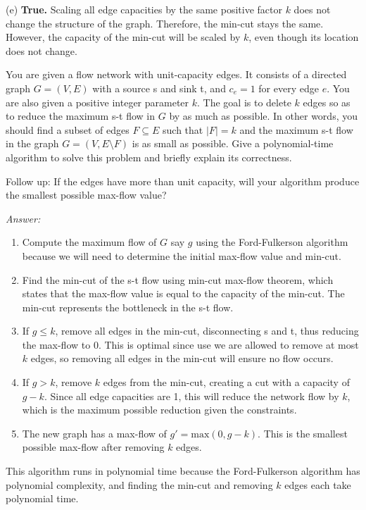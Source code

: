 \documentclass[12pt]{article}
\newenvironment{problem}[2][Problem]{\begin{trivlist}
\item[\hskip \labelsep {\bfseries #1}\hskip \labelsep {\bfseries #2.}]}{\end{trivlist}}
\begin{document}
(e) \textbf{True.} Scaling all edge capacities by the same positive factor $k$ does not change the structure of the graph. Therefore, the min-cut stays the same. However, the capacity of the min-cut will be scaled by $k$, even though its location does not change.

\begin{problem}{3}
    You are given a flow network with unit-capacity edges. It consists of a directed graph $G=(V,E)$ with a source s and sink t, and $c_e=1$ for every edge $e$. You are also given a positive integer parameter $k$. The goal is to delete $k$ edges so as to reduce the maximum s-t flow in $G$ by as much as possible. In other words, you should find a subset of edges $F \subseteq E$ such that $|F|=k$ and the maximum s-t flow in the graph $G=(V,E\setminus F)$ is as small as possible. Give a polynomial-time algorithm to solve this problem and briefly explain its correctness.

    Follow up: If the edges have more than unit capacity, will your algorithm produce the smallest possible max-flow value?
\end{problem}

\textit{Answer: }

\begin{enumerate}
    \item Compute the maximum flow of $G$ say $g$ using the Ford-Fulkerson algorithm because we will need to determine the initial max-flow value and min-cut.
    \item Find the min-cut of the s-t flow using min-cut max-flow theorem, which states that the max-flow value is equal to the capacity of the min-cut. The min-cut represents the bottleneck in the s-t flow.
    \item If $g\leq k$, remove all edges in the min-cut, disconnecting s and t, thus reducing the max-flow to 0. This is optimal since use we are allowed to remove at most $k$ edges, so removing all edges in the min-cut will ensure no flow occurs.
    \item If $g>k$, remove $k$ edges from the min-cut, creating a cut with a capacity of $g-k$. Since all edge capacities are 1, this will reduce the network flow by $k$, which is the maximum possible reduction given the constraints.
    \item The new graph has a max-flow of $g'=\text{max}(0,g-k)$. This is the smallest possible max-flow after removing $k$ edges.
\end{enumerate}

This algorithm runs in polynomial time because the Ford-Fulkerson algorithm has polynomial complexity, and finding the min-cut and removing $k$ edges each take polynomial time.
\end{document}

